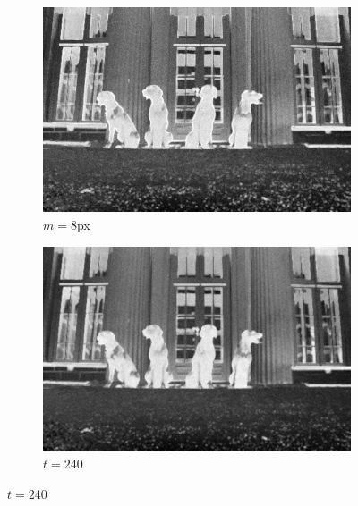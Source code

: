 \begin{figure}[H]
    \begin{subfigure}{0.4\textwidth}
      \centering
      \includegraphics[scale=1.0]{obrazky/StentifordSM-8pix.jpg}
      \caption{$m=8$px}
    \end{subfigure}
    \begin{subfigure}{0.4\textwidth}
      \centering
      \includegraphics[scale=1.0]{obrazky/StentifordSM-240forks.jpg}
      \caption{$t=240$}
    \end{subfigure}
    \vspace{1pt}
    

\end{figure}
